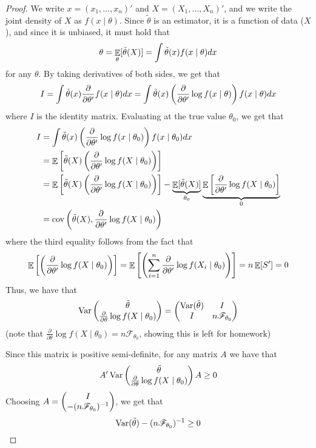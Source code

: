 \documentclass[10pt]{article}
\begin{document}
\begin{proof}
	We write $x = (x_1,\dots,x_n)'$ and $X = (X_1,\dots,X_n)'$, and we write the joint density of $X$ as $f(x\mid \theta)$. Since $\tilde{\theta}$ is an estimator, it is a function of data ($X$), and since it is unbiased, it must hold that
	\[
	\theta = \mathop{\mathbb{E}}_\theta[\tilde{\theta}(X)] = \int \tilde{\theta}(x)f(x \mid \theta) dx
	\]
	for any $\theta$. By taking derivatives of both sides, we get that
	\[
	I = \int \tilde{\theta}(x) \frac{\partial}{\partial \theta'} f(x \mid \theta) dx =  \int \tilde{\theta}(x) \left( \frac{\partial}{\partial \theta'} \log f(x \mid \theta) \right) f(x \mid \theta) dx
	\]
	where $I$ is the identity matrix. Evaluating at the true value $\theta_0$, we get that
	\begin{align*}
		I &=  \int \tilde{\theta}(x) \left( \frac{\partial}{\partial \theta'} \log f(x \mid \theta_0) \right) f(x \mid \theta_0) dx \\
		&= \mathop{\mathbb{E}} \left[ \tilde{\theta}(X) \left( \frac{\partial}{\partial \theta'} \log f(X \mid \theta_0) \right)\right] \\
		&= \mathop{\mathbb{E}} \left[ \tilde{\theta}(X) \left( \frac{\partial}{\partial \theta'} \log f(X \mid \theta_0) \right)\right] - \underbrace{\mathop{\mathbb{E}}[\tilde{\theta}(X)]}_{\theta_0} \underbrace{\mathop{\mathbb{E}} \left[ \frac{\partial}{\partial \theta'} \log f(X \mid \theta_0) \right]}_0 \\
		&= \mathop{\rm cov}\left( \tilde{\theta}(X), \frac{\partial}{\partial \theta'} \log f(X \mid \theta_0)\right)
	\end{align*}
	where the third equality follows from the fact that
	\[
	\mathop{\mathbb{E}} \left[\left( \frac{\partial}{\partial \theta'} \log f(X \mid \theta_0) \right)\right] = \mathop{\mathbb{E}} \left[\left( \sum_{i=1}^n \frac{\partial}{\partial \theta'} \log f(X_i \mid \theta_0)\right) \right] = n \mathop{\mathbb{E}}[S'] = 0
	\]
	Thus, we have that
	\[
	\mathop{\rm Var} \begin{pmatrix}\tilde{\theta} \\ \frac{\partial}{\partial \theta} \log f(X \mid \theta_0)\end{pmatrix} = \begin{pmatrix}\mathop{\rm Var}(\tilde{\theta}) & I \\ I & n\mathscr{F}_{\theta_0}\end{pmatrix}
	\]
	(note that $\frac{\partial}{\partial \theta} \log f(X \mid \theta_0) =n\mathscr{F}_{\theta_0} $, showing this is left for homework)
	
	Since this matrix is positive semi-definite, for any matrix $A$ we have that
	\[
	A' \mathop{\rm Var} \begin{pmatrix}\tilde{\theta} \\ \frac{\partial}{\partial \theta} \log f(X \mid \theta_0)\end{pmatrix} A \ge 0
	\]
	Choosing $A = \begin{pmatrix}I \\ -(n\mathscr{F}_{\theta_0})^{-1}\end{pmatrix}$, we get that
	\[
	\mathop{\rm Var}(\tilde{\theta}) - (n\mathscr{F}_{\theta_0})^{-1} \ge 0
	\]
\end{proof}
\end{document}
